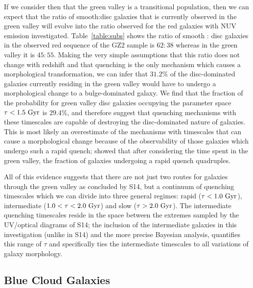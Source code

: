 If we consider then that the green valley is a transitional population, then we can expect that the ratio of smooth:disc galaxies that is currently observed in the green valley will evolve into the ratio observed for the red galaxies with NUV emission investigated. Table~\ref{table:subs} shows the ratio of smooth : disc galaxies in the observed red sequence of the GZ2 sample is $62:38$ whereas in the green valley it is $45:55$. Making the very simple assumptions that this ratio does not change with redshift and that quenching is the only mechanism which causes a morphological transformation, we can infer that $31.2\%$ of the disc-dominated galaxies currently residing in the green valley would have to undergo a morphological change to a bulge-dominated galaxy. We find that the fraction of the probability for green valley disc galaxies occupying the parameter space $\tau < 1.5 ~\rm{Gyr}$ is $29.4\%$, and therefore suggest that quenching mechanisms with these timescales are capable of destroying the disc-dominated nature of galaxies. This is most likely an overestimate of the mechanisms with timescales that can cause a morphological change because of the observability of those galaxies which undergo such a rapid quench; \citet{Martin07} showed that after considering the time spent in the green valley, the fraction of galaxies undergoing a rapid quench quadruples.

All of this evidence suggests that there are not just two routes for galaxies through the green valley as concluded by S14, but a continuum of quenching timescales which we can divide into three general regimes: rapid ($\tau < 1.0 ~\rm{Gyr}$), intermediate ($1.0 < \tau < 2.0~\rm{Gyr}$) and slow ($\tau > 2.0~\rm{Gyr}$). The intermediate quenching timescales reside in the space between the extremes sampled by the UV/optical diagrams of S14; the inclusion of the intermediate galaxies in this investigation (unlike in S14) and the more precise Bayesian analysis, quantifies this range of $\tau$ and specifically ties the intermediate timescales to all variations of galaxy morphology.


\subsection{Blue Cloud Galaxies}\label{bc}

